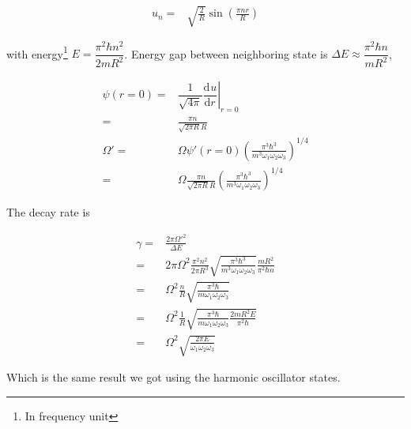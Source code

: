 \documentclass[10pt,fleqn]{article}
\newcommand{\ud}{\mathrm{d}}
\newcommand{\eqar}[1]
{
  \begin{align*}
    #1
  \end{align*}
}
\newcommand{\paren}[1]{{\left({#1}\right)}}
\newcommand{\ddiff}[3][{}]{{\dfrac{\ud^{#1} {#2}}{\ud {#3}{}^{#1}}}}
\begin{document}
\eqar{
  u_n=&\sqrt{\frac{2}{R}}\sin\paren{\frac{\pi nr}{R}}
}

with energy\footnote{In frequency unit} $E=\dfrac{\pi^2\hbar n^2}{2mR^2}$.
Energy gap between neighboring state is $\Delta E\approx\dfrac{\pi^2\hbar n}{mR^2}$,

\eqar{
  \psi(r=0)=&\left.\dfrac{1}{\sqrt{4\pi}}\ddiff{u}{r}\right|_{r=0}\\
  =&\frac{\pi n}{\sqrt{2\pi R}R}\\
  \Omega'=&\Omega\psi'(r=0)\paren{\frac{\pi^3\hbar^3}{m^3\omega_1\omega_2\omega_3}}^{1/4}\\
  =&\Omega\frac{\pi n}{\sqrt{2\pi R}R}\paren{\frac{\pi^3\hbar^3}{m^3\omega_1\omega_2\omega_3}}^{1/4}
}

The decay rate is
\eqar{
  \gamma=&\frac{2\pi\Omega'^2}{\Delta E}\\
  =&2\pi\Omega^2\frac{\pi^2 n^2}{2\pi R^3}\sqrt{\frac{\pi^3\hbar^3}{m^3\omega_1\omega_2\omega_3}}\frac{mR^2}{\pi^2\hbar n}\\
  =&\Omega^2\frac{n}{R}\sqrt{\frac{\pi^3\hbar}{m\omega_1\omega_2\omega_3}}\\
  =&\Omega^2\frac{1}{R}\sqrt{\frac{\pi^3\hbar}{m\omega_1\omega_2\omega_3}\frac{2mR^2E}{\pi^2\hbar}}\\
  =&\Omega^2\sqrt{\frac{2\pi E}{\omega_1\omega_2\omega_3}}
}
Which is the same result we got using the harmonic oscillator states.
\end{document}
